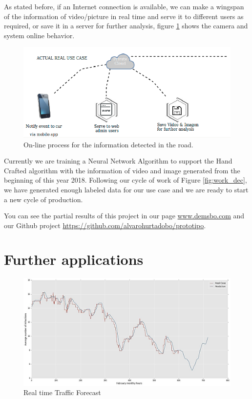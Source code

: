 \documentclass[fleqn,12pt]{SelfArx} %
\begin{document}
As stated before, if an Internet connection is available, we can make a wingspan of the information of video/picture in real time and serve it to different users as required, or save it in a server for further analysis, figure \ref{fig:online} shows the camera and system online behavior.


\begin{figure}[t]\centering
	\includegraphics[width=\linewidth]{images/online}
	\caption{On-line process for the information detected in the road. }
	\label{fig:online}
\end{figure}

Currently we are training a Neural Network Algorithm to support the Hand Crafted algorithm with the information of video and image generated from the beginning of this year 2018. Following our cycle of work of Figure \ref{fig:work_dec}, we have generated enough labeled data for our use case and we are ready to start a new cycle of production.

You can see the partial results of this project in our page \href{www.demsbo.com}{www.demsbo.com} and our Github project \href{https://github.com/alvarohurtadobo/prototipo}{https://github.com/alvarohurtadobo/prototipo}.



\section{Further applications}

\begin{figure}[h]\centering %
	\includegraphics[width=\linewidth]{images/data}
	\caption{Real time Traffic Forecast}
	\label{fig:forecast}
\end{figure}
 
\end{document}
